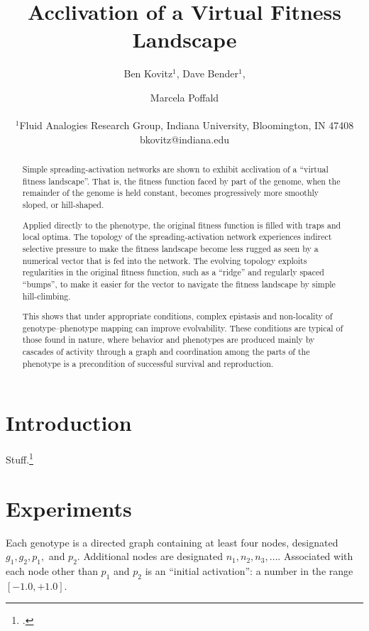 \documentclass[letterpaper]{article}
\title{Acclivation of a Virtual Fitness Landscape}
\author{Ben Kovitz$^{1}$, Dave Bender$^{1}$, \and Marcela Poffald \\
\mbox{}\\
$^1$Fluid Analogies Research Group, Indiana University, Bloomington, IN 47408 \\
bkovitz@indiana.edu}
\begin{document}
\maketitle

\begin{abstract}
Simple spreading-activation networks are shown to exhibit acclivation of a
``virtual fitness landscape''. That is, the fitness function faced by part of
the genome, when the remainder of the genome is held constant, becomes
progressively more smoothly sloped, or hill-shaped.

Applied directly to the phenotype, the original fitness function is filled
with traps and local optima. The topology of the spreading-activation network
experiences indirect selective pressure to make the fitness landscape become
less rugged as seen by a numerical vector that is fed into the network.
The evolving topology exploits regularities in the original fitness
function, such as a ``ridge'' and regularly spaced ``bumps'', to make it
easier for the vector to navigate the fitness landscape by simple
hill-climbing.

This shows that under appropriate conditions, complex \mbox{epistasis} and
non-locality of genotype--phenotype mapping can improve evolvability. These
conditions are typical of those found in nature, where behavior and phenotypes
are produced mainly by cascades of activity through a graph and coordination
among the parts of the phenotype is a precondition of successful survival and
reproduction.

\end{abstract}

%

\section{Introduction}
Stuff.\footnote{\cite{hogeweg2012toward}.}

\section{Experiments}

Each genotype is a directed graph containing at least four nodes, designated
$g_1, g_2, p_1,$ and $p_2$. Additional nodes are designated $n_1, n_2, n_3,
\ldots$. Associated with each node other than $p_1$ and $p_2$ is an ``initial
activation'': a number in the range $[-1.0,+1.0]$.
\end{document}
